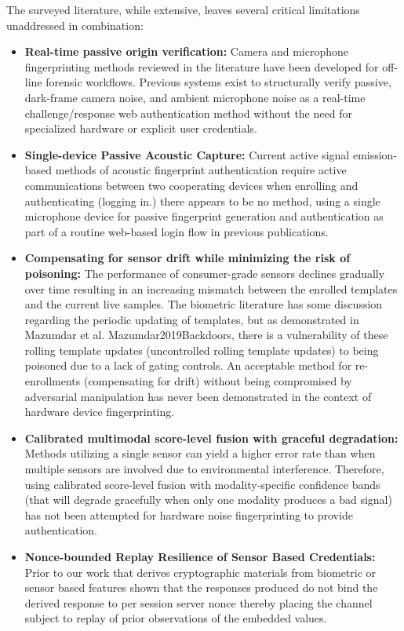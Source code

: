 The surveyed literature, while extensive, leaves several critical limitations unaddressed in combination:

\begin{itemize}
    \item \textbf{Real-time passive origin verification:} Camera and microphone fingerprinting methods reviewed in the literature have been developed for off-line forensic workflows. Previous systems exist to structurally verify passive, dark-frame camera noise, and ambient microphone noise as a real-time challenge/response web authentication method without the need for specialized hardware or explicit user credentials. 

    \item \textbf{Single-device Passive Acoustic Capture:} Current active signal emission-based methods of acoustic fingerprint authentication require active communications between two cooperating devices when enrolling and authenticating (logging in.) there appears to be no method, using a single microphone device for passive fingerprint generation and authentication as part of a routine web-based login flow in previous publications.

    \item \textbf{Compensating for sensor drift while minimizing the risk of poisoning:} The performance of consumer-grade sensors declines gradually over time resulting in an increasing mismatch between the enrolled templates and the current live samples. The biometric literature has some discussion regarding the periodic updating of templates, but as demonstrated in Mazumdar et al. Mazumdar2019Backdoors, there is a vulnerability of these rolling template updates (uncontrolled rolling template updates) to being poisoned due to a lack of gating controls. An acceptable method for re-enrollments (compensating for drift) without being compromised by adversarial manipulation has never been demonstrated in the context of hardware device fingerprinting. 

    \item \textbf{Calibrated multimodal score-level fusion with graceful degradation:} Methods utilizing a single sensor can yield a higher error rate than when multiple sensors are involved due to environmental interference. Therefore, using calibrated score-level fusion with modality-specific confidence bands (that will degrade gracefully when only one modality produces a bad signal) has not been attempted for hardware noise fingerprinting to provide authentication.

    \item \textbf{Nonce-bounded Replay Resilience of Sensor Based Credentials:} Prior to our work that derives cryptographic materials from biometric or sensor based features shown that the responses produced do not bind the derived response to per session server nonce thereby placing the channel subject to replay of prior observations of the embedded values.
\end{itemize}

